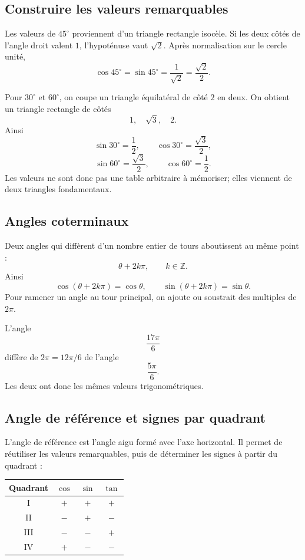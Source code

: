\documentclass[12pt,a4paper,openany]{book}
\newcommand{\Z}{\mathbb{Z}}
\begin{document}
\subsection{Construire les valeurs remarquables}

Les valeurs de $45^\circ$ proviennent d'un triangle rectangle isocèle. Si les deux côtés de l'angle droit valent $1$, l'hypoténuse vaut $\sqrt2$. Après normalisation sur le cercle unité,
\[
\cos45^\circ=\sin45^\circ=\frac1{\sqrt2}=\frac{\sqrt2}{2}.
\]

Pour $30^\circ$ et $60^\circ$, on coupe un triangle équilatéral de côté $2$ en deux. On obtient un triangle rectangle de côtés
\[
1,\quad\sqrt3,\quad2.
\]
Ainsi
\[
\sin30^\circ=\frac12,
\qquad
\cos30^\circ=\frac{\sqrt3}{2},
\]
\[
\sin60^\circ=\frac{\sqrt3}{2},
\qquad
\cos60^\circ=\frac12.
\]
Les valeurs ne sont donc pas une table arbitraire à mémoriser; elles viennent de deux triangles fondamentaux.

\subsection{Angles coterminaux}

Deux angles qui diffèrent d'un nombre entier de tours aboutissent au même point :
\[
\theta+2k\pi,
\qquad k\in\Z.
\]
Ainsi
\[
\cos(\theta+2k\pi)=\cos\theta,
\qquad
\sin(\theta+2k\pi)=\sin\theta.
\]
Pour ramener un angle au tour principal, on ajoute ou soustrait des multiples de $2\pi$.

\begin{examplebox}
L'angle
\[
\frac{17\pi}{6}
\]
diffère de $2\pi=12\pi/6$ de l'angle
\[
\frac{5\pi}{6}.
\]
Les deux ont donc les mêmes valeurs trigonométriques.
\end{examplebox}

\subsection{Angle de référence et signes par quadrant}

L'angle de référence est l'angle aigu formé avec l'axe horizontal. Il permet de réutiliser les valeurs remarquables, puis de déterminer les signes à partir du quadrant :
\begin{center}
\begin{tabular}{c|ccc}
\toprule
Quadrant & $\cos$ & $\sin$ & $\tan$\\\midrule
I & $+$ & $+$ & $+$\\
II & $-$ & $+$ & $-$\\
III & $-$ & $-$ & $+$\\
IV & $+$ & $-$ & $-$\\
\bottomrule
\end{tabular}
\end{center}
\end{document}

